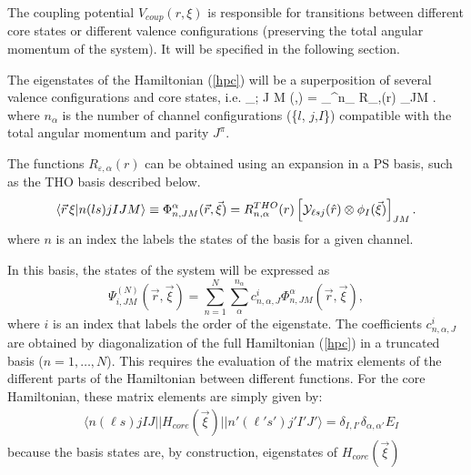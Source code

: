 \documentclass[preprint,12pt]{elsarticle}
\begin{document}
The coupling potential $V_{coup}(r,\xi)$ is responsible for transitions between different core states or different valence configurations (preserving the total angular momentum of the system). It will be specified in the following section.

The eigenstates of the Hamiltonian (\ref{hpc}) 
will be a superposition of several valence configurations and core
states, i.e. 
\be
\Psi_{\varepsilon; J M }(,\vec{\xi}) 
 =  \sum_{\alpha}^{n_\alpha} R_{\varepsilon,\alpha}(r) 
_{JM} .
\label{wfx}
\ee 
where $n_\alpha$ is the number of channel configurations (\{$l$, $j$,$I$\}) compatible with the total angular momentum and parity $J^\pi$. 

The functions $R_{\varepsilon,\alpha}(r)$ can be
obtained using an expansion in a PS basis, such as the THO basis
described below. 
\begin{equation}
\langle \vec{r} \, \xi | n (ls) j I J M \rangle \equiv
\Phi^\alpha_{n,J M }(\vec{r},\vec{\xi}) 
 =  R^{THO}_{n,\alpha}(r) \left[  {\cal Y}_{\ell s j}(\hat{r}) \otimes
   \phi_{I}(\vec{\xi}) \right]_{JM} . 
\label{basis2}
\end{equation}
where $n$ is an index the labels the states of the basis for a given channel. 


In this basis, the states of the system will be expressed as
\begin{equation}
\Psi^{(N)}_{i,J M }(\vec{r},\vec{\xi}) 
 =  \sum_{n=1}^{N} \sum_{\alpha}^{n_\alpha} c^i_{n,\alpha,J} \Phi^\alpha_{n,J M
 }(\vec{r},\vec{\xi}) ,
\label{eigenvector}
\end{equation}
where $i$ is an index that labels the order of the eigenstate. The coefficients $c^i_{n,\alpha,J}$ are obtained by diagonalization of the full Hamiltonian 
(\ref{hpc}) in a truncated basis ($n=1,\ldots,N$). This requires the evaluation of the matrix elements of the different parts of the Hamiltonian between different 
functions. For the core Hamiltonian, these matrix elements are simply given by:
\begin{eqnarray}
& \langle n (\ell s)j I J || H_{core}(\vec{\xi}) || n' (\ell's')j' I' J' \rangle = \delta_{I,I'} \delta_{\alpha,\alpha'} E_I
\end{eqnarray}
because the basis states are, by construction, eigenstates of  $H_{core}(\vec{\xi})$
\end{document}

